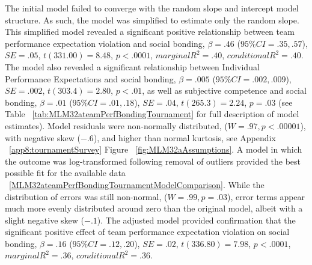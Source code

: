 \begin{CJK}{UTF8}{gbsn}
  The initial model failed to converge with the random slope and intercept model structure.  As such, the model was simplified to estimate only the random slope. This simplified model revealed a significant positive relationship between team performance expectation violation and social bonding, $\beta = .46$ ($95\% CI =  .35, .57$), $SE = .05$, $t(331.00) = 8.48$, $p < .0001$, $marginal R^2 = .40$, $conditional R^2 = .40$.
  The model also revealed a significant relationship between Individual Performance Expectations and social bonding, $\beta = .005$ ($95\% CI =  .002, .009$), $SE = .002$, $t(303.4) = 2.80$, $p < .01$, as well as subjective competence and social bonding, $\beta = .01$ ($95\% CI =  .01, .18$), $SE = .04$, $t(265.3) = 2.24$, $p = .03$ (see Table ~\ref{tab:MLM32ateamPerfBondingTournament} for full description of model estimates).  Model residuals were non-normally distributed, ($W = .97, p < .00001$), with negative skew ($-.6$), and higher than normal kurtosis, see Appendix ~\ref{app8:tournamentSurvey} Figure ~\ref{fig:MLM32aAssumptions}.  A model in which the outcome was log-transformed following removal of outliers provided the best possible fit for the available data ~\ref{MLM32ateamPerfBondingTournamentModelComparison}. While the distribution of errors was still non-normal, ($W = .99, p = .03$),  error terms appear much more evenly distributed around zero than the original model, albeit with a slight negative skew ($-.1$).
  The adjusted model provided confirmation that the significant positive effect of team performance expectation violation on social bonding,  $\beta = .16$ ($95\% CI =  .12, .20$), $SE = .02$, $t(336.80) = 7.98$, $p < .0001$, $marginal R^2 = .36$, $conditional R^2 = .36$.

   

   



\end{CJK}
